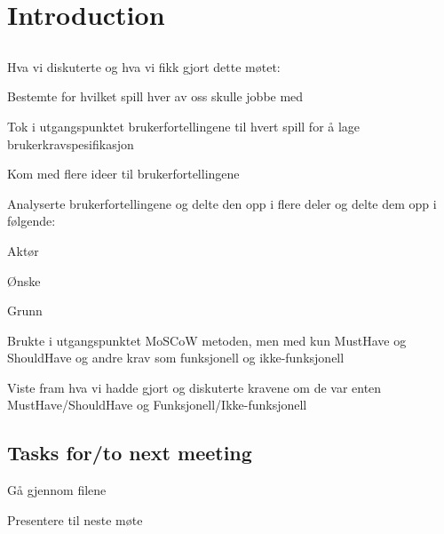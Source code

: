\documentclass[11pt]{meetingmins}
\begin{document}
\maketitle
\section{Introduction}
\subsection{}

Hva vi diskuterte og hva vi fikk gjort dette møtet:

\begin{items}
\item
Bestemte for hvilket spill hver av oss skulle jobbe med
\item
Tok i utgangspunktet brukerfortellingene til hvert spill for å lage brukerkravspesifikasjon
\item
Kom med flere ideer til brukerfortellingene 
\item
Analyserte brukerfortellingene og delte den opp i flere deler og delte dem opp i følgende:
\begin {items}
		\item Aktør 
		\item Ønske
		\item Grunn
\end{items}
\item
Brukte i utgangspunktet MoSCoW metoden, men med kun MustHave og ShouldHave og andre krav som funksjonell og ikke-funksjonell
\item
Viste fram hva vi hadde gjort og diskuterte kravene om de var enten MustHave/ShouldHave og Funksjonell/Ikke-funksjonell
\end{items}

\subsection{Tasks for/to next meeting}
\begin{items}
\item
Gå gjennom filene
\item
Presentere til neste møte
\end{items}


\vspace{1em}
\end{document}
